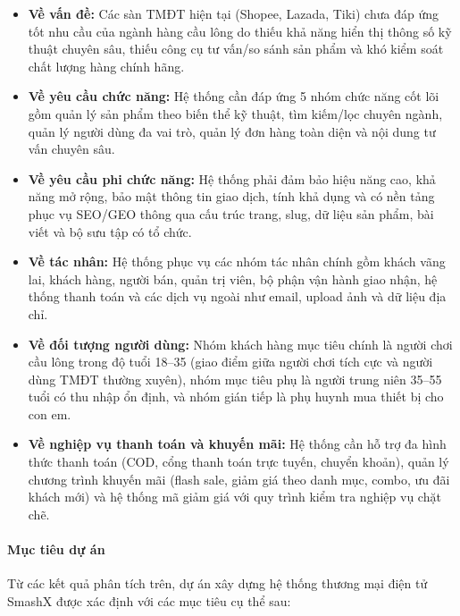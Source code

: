 \documentclass[13pt]{article}
\begin{document}
\begin{itemize}
    \item \textbf{Về vấn đề:} Các sàn TMĐT hiện tại (Shopee, Lazada, Tiki) chưa đáp ứng tốt nhu cầu của ngành hàng cầu lông do thiếu khả năng hiển thị thông số kỹ thuật chuyên sâu, thiếu công cụ tư vấn/so sánh sản phẩm và khó kiểm soát chất lượng hàng chính hãng.
    
    \item \textbf{Về yêu cầu chức năng:} Hệ thống cần đáp ứng 5 nhóm chức năng cốt lõi gồm quản lý sản phẩm theo biến thể kỹ thuật, tìm kiếm/lọc chuyên ngành, quản lý người dùng đa vai trò, quản lý đơn hàng toàn diện và nội dung tư vấn chuyên sâu.
    
    \item \textbf{Về yêu cầu phi chức năng:} Hệ thống phải đảm bảo hiệu năng cao, khả năng mở rộng, bảo mật thông tin giao dịch, tính khả dụng và có nền tảng phục vụ SEO/GEO thông qua cấu trúc trang, slug, dữ liệu sản phẩm, bài viết và bộ sưu tập có tổ chức.
    
    \item \textbf{Về tác nhân:} Hệ thống phục vụ các nhóm tác nhân chính gồm khách vãng lai, khách hàng, người bán, quản trị viên, bộ phận vận hành giao nhận, hệ thống thanh toán và các dịch vụ ngoài như email, upload ảnh và dữ liệu địa chỉ.
    
    \item \textbf{Về đối tượng người dùng:} Nhóm khách hàng mục tiêu chính là người chơi cầu lông trong độ tuổi 18--35 (giao điểm giữa người chơi tích cực và người dùng TMĐT thường xuyên), nhóm mục tiêu phụ là người trung niên 35--55 tuổi có thu nhập ổn định, và nhóm gián tiếp là phụ huynh mua thiết bị cho con em.
    
    \item \textbf{Về nghiệp vụ thanh toán và khuyến mãi:} Hệ thống cần hỗ trợ đa hình thức thanh toán (COD, cổng thanh toán trực tuyến, chuyển khoản), quản lý chương trình khuyến mãi (flash sale, giảm giá theo danh mục, combo, ưu đãi khách mới) và hệ thống mã giảm giá với quy trình kiểm tra nghiệp vụ chặt chẽ.
\end{itemize}

\paragraph{Mục tiêu dự án}

Từ các kết quả phân tích trên, dự án xây dựng hệ thống thương mại điện tử SmashX được xác định với các mục tiêu cụ thể sau:
\end{document}
